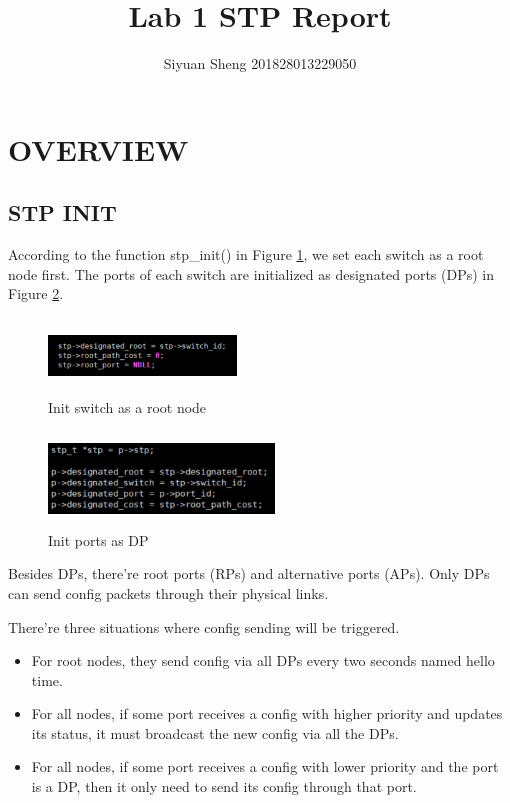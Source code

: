 \documentclass{article}
\title{Lab 1 STP Report}
\author{Siyuan Sheng 201828013229050}
\date{\ukdate{\formatdate{28}{4}{2019}}}
\begin{document}
\maketitle

\section{OVERVIEW}

\subsection{STP INIT}

According to the function stp\_init() in Figure \ref{init_stp}, we set each switch as a root node first.
The ports of each switch are initialized as designated ports (DPs) in Figure \ref{init_port}.

\begin{figure}[ht]
	\centering
	\includegraphics[width=5cm, height=2cm]{init_stp.png}
	\caption{Init switch as a root node}
	\label{init_stp}
\end{figure}

\begin{figure}[ht]
	\centering
	\includegraphics[width=6cm, height=2.5cm]{init_port.png}
	\caption{Init ports as DP}
	\label{init_port}
\end{figure}

Besides DPs, there're root ports (RPs) and alternative ports (APs). 
Only DPs can send config packets through their physical links.

There're three situations where config sending will be triggered.

\begin{itemize}[topsep=0pt, itemsep=0pt, parsep=0pt]
\item[(1)] For root nodes, they send config via all DPs every two seconds 
named hello time. 
\item[(2)] For all nodes, if some port receives a config with higher priority and 
updates its status, it must broadcast the new config via all the DPs.
\item[(3)] For all nodes, if some port receives a config with lower priority and the 
port is a DP, then it only need to send its config through that port.
\end{itemize}
\end{document}
